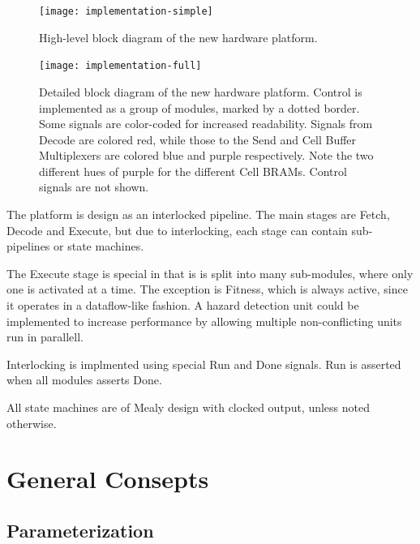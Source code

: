 \begin{figure}[!ht]
    \centering
    \texttt{[image: implementation-simple]}
    \caption[High-level system diagram]{High-level block diagram of the new hardware platform.}
    \label{fig:implementation-simple}
\end{figure}

\begin{figure}
    \centering
    \texttt{[image: implementation-full]}
    \caption[Detailed system diagram]{
        Detailed block diagram of the new hardware platform.
        Control is implemented as a group of modules, marked by a dotted border.
        Some signals are color-coded for increased readability.
        Signals from Decode are colored red, while those to the Send and Cell Buffer Multiplexers are colored blue and purple respectively.
        Note the two different hues of purple for the different Cell BRAMs.
        Control signals are not shown.
    }
    \label{fig:implementation-full}
\end{figure}

The platform is design as an interlocked pipeline.
The main stages are Fetch, Decode and Execute, but due to interlocking, each stage can contain sub-pipelines or state machines.

The Execute stage is special in that is is split into many sub-modules, where only one is activated at a time.
The exception is Fitness, which is always active, since it operates in a dataflow-like fashion.
A hazard detection unit could be implemented to increase performance by allowing multiple non-conflicting units run in parallell.

Interlocking is implmented using special Run and Done signals.
Run is asserted when all modules asserts Done.

All state machines are of Mealy design with clocked output, unless noted otherwise.



\section{General Consepts}


\subsection{Parameterization}

